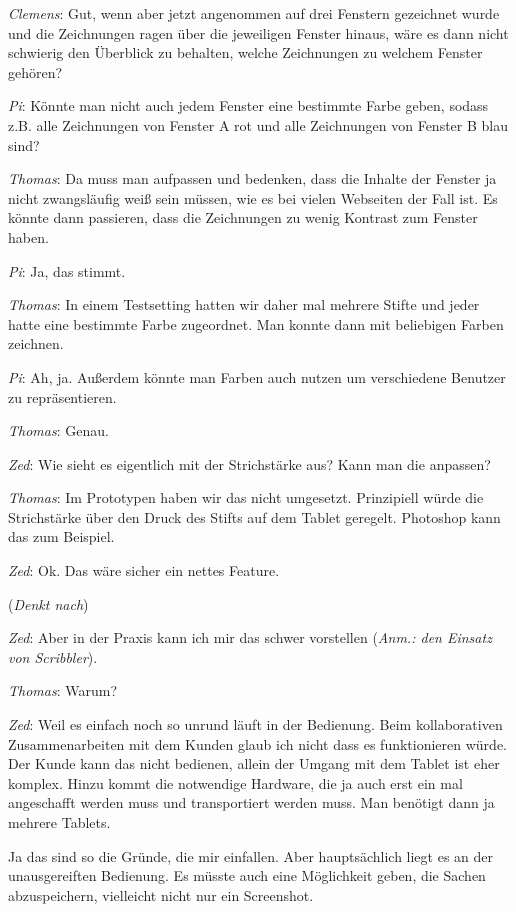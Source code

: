 \medskip \emph{Clemens}: Gut, wenn aber jetzt angenommen auf drei Fenstern gezeichnet wurde und die Zeichnungen ragen über die jeweiligen Fenster hinaus, wäre es dann nicht schwierig den Überblick zu behalten, welche Zeichnungen zu welchem Fenster gehören?

\medskip \emph{Pi}: Könnte man nicht auch jedem Fenster eine bestimmte Farbe geben, sodass z.B. alle Zeichnungen von Fenster A rot und alle Zeichnungen von Fenster B blau sind?

\medskip \emph{Thomas}: Da muss man aufpassen und bedenken, dass die Inhalte der Fenster ja nicht zwangsläufig weiß sein müssen, wie es bei vielen Webseiten der Fall ist. Es könnte dann passieren, dass die Zeichnungen zu wenig Kontrast zum Fenster haben.

\medskip \emph{Pi}: Ja, das stimmt.

\medskip \emph{Thomas}: In einem Testsetting hatten wir daher mal mehrere Stifte und jeder hatte eine bestimmte Farbe zugeordnet. Man konnte dann mit beliebigen Farben zeichnen.

\medskip \emph{Pi}: Ah, ja. Außerdem könnte man Farben auch nutzen um verschiedene Benutzer zu repräsentieren.

\medskip \emph{Thomas}: Genau.

\medskip \emph{Zed}: Wie sieht es eigentlich mit der Strichstärke aus? Kann man die anpassen?

\medskip \emph{Thomas}: Im Prototypen haben wir das nicht umgesetzt. Prinzipiell würde die Strichstärke über den Druck des Stifts auf dem Tablet geregelt. Photoshop kann das zum Beispiel.

\medskip \emph{Zed}: Ok. Das wäre sicher ein nettes Feature. 

\medskip (\emph{Denkt nach})

\medskip \emph{Zed}: Aber in der Praxis kann ich mir das schwer vorstellen (\emph{Anm.: den Einsatz von Scribbler}).

\medskip \emph{Thomas}: Warum?

\medskip \emph{Zed}: Weil es einfach noch so unrund läuft in der Bedienung. Beim kollaborativen Zusammenarbeiten mit dem Kunden glaub ich nicht dass es funktionieren würde. Der Kunde kann das nicht bedienen, allein der Umgang mit dem Tablet ist eher komplex. Hinzu kommt die notwendige Hardware, die ja auch erst ein mal angeschafft werden muss und transportiert werden muss. Man benötigt dann ja mehrere Tablets. 

Ja das sind so die Gründe, die mir einfallen. Aber hauptsächlich liegt es an der unausgereiften Bedienung. Es müsste auch eine Möglichkeit geben, die Sachen abzuspeichern, vielleicht nicht nur ein Screenshot.

